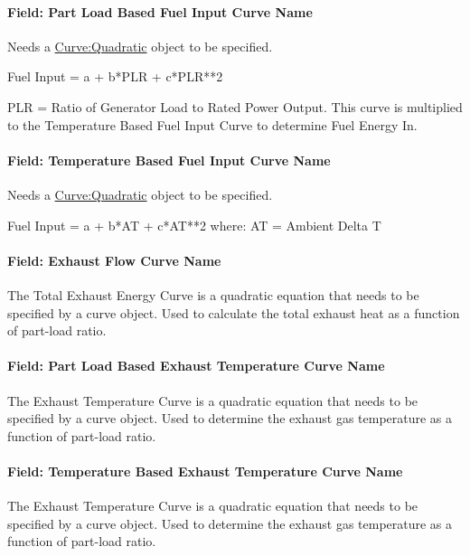 \paragraph{Field: Part Load Based Fuel Input Curve Name}\label{field-part-load-based-fuel-input-curve-name}

Needs a \hyperref[curvequadratic]{Curve:Quadratic} object to be specified.

Fuel Input = a + b*PLR + c*PLR**2

PLR = Ratio of Generator Load to Rated Power Output. This curve is multiplied to the Temperature Based Fuel Input Curve to determine Fuel Energy In.

\paragraph{Field: Temperature Based Fuel Input Curve Name}\label{field-temperature-based-fuel-input-curve-name}

Needs a \hyperref[curvequadratic]{Curve:Quadratic} object to be specified.

Fuel Input = a + b*AT + c*AT**2 where: AT = Ambient Delta T

\paragraph{Field: Exhaust Flow Curve Name}\label{field-exhaust-flow-curve-name}

The Total Exhaust Energy Curve is a quadratic equation that needs to be specified by a curve object. Used to calculate the total exhaust heat as a function of part-load ratio.

\paragraph{Field: Part Load Based Exhaust Temperature Curve Name}\label{field-part-load-based-exhaust-temperature-curve-name}

The Exhaust Temperature Curve is a quadratic equation that needs to be specified by a curve object. Used to determine the exhaust gas temperature as a function of part-load ratio.

\paragraph{Field: Temperature Based Exhaust Temperature Curve Name}\label{field-temperature-based-exhaust-temperature-curve-name}

The Exhaust Temperature Curve is a quadratic equation that needs to be specified by a curve object. Used to determine the exhaust gas temperature as a function of part-load ratio.


